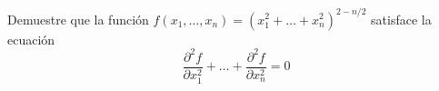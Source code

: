 \item Demuestre que la función $f(x_1, \dots, x_n) = (x_1^2 + \dots + x_n^2)^{2-n/2}$ satisface la ecuación
\[ \frac{\partial^2 f}{\partial x_1^2} + \dots + \frac{\partial^2 f}{\partial x_n^2} = 0 \]
